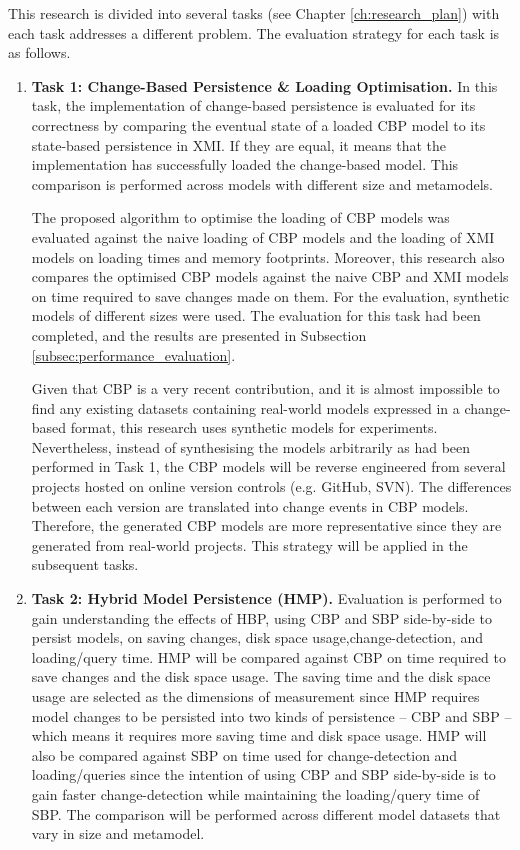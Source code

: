 \documentclass[12pt, a4paper]{report} \usepackage[titletoc]{appendix}
\begin{document}
This research is divided into several tasks (see Chapter \ref{ch:research_plan}) with each task addresses a different problem. The evaluation strategy for each task is as follows. 
\begin{enumerate}
	\item \textbf{Task 1: Change-Based Persistence \& Loading Optimisation.} In this task, the implementation of change-based persistence is evaluated for its correctness by comparing the eventual state of a loaded CBP model to its state-based persistence in XMI. If they are equal, it means that the implementation has successfully loaded the change-based model. This comparison is performed across models with different size and metamodels.    
    
    The proposed algorithm to optimise the loading of CBP models was evaluated against the naive loading of CBP models and the loading of XMI models on loading times and memory footprints. Moreover, this research also compares the optimised CBP models against the naive CBP and XMI models on time required to save changes made on them. For the evaluation, synthetic models of different sizes were used. The evaluation for this task had been completed, and the results are presented in Subsection \ref{subsec:performance_evaluation}.
	
	Given that CBP is a very recent contribution, and it is almost impossible to find any existing datasets containing real-world models expressed in a change-based format, this research uses synthetic models for experiments. Nevertheless, instead of synthesising the models arbitrarily as had been performed in Task 1, the CBP models will be reverse engineered from several projects hosted on online version controls (e.g. GitHub, SVN). The differences between each version are translated into change events in CBP models. Therefore, the generated CBP models are more representative since they are generated from real-world projects. This strategy will be applied in the subsequent tasks.
	
	\item \textbf{Task 2: Hybrid Model Persistence (HMP).} Evaluation is performed to gain understanding the effects of HBP, using CBP and SBP side-by-side to persist models, on saving changes, disk space usage,change-detection, and loading/query time. HMP will be compared against CBP on time required to save changes and the disk space usage. The saving time and the disk space usage are selected as the dimensions of measurement since HMP requires model changes to be persisted into two kinds of persistence -- CBP and SBP -- which means it requires more saving time and disk space usage. HMP will also be compared against SBP on time used for change-detection and loading/queries since the intention of using CBP and SBP side-by-side is to gain faster change-detection while maintaining the loading/query time of SBP. The comparison will be performed across different model datasets that vary in size and metamodel.
	

\end{enumerate}
\end{document}

